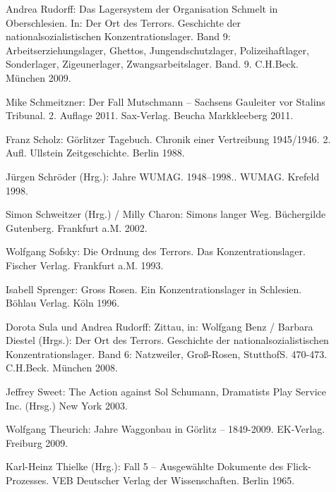 \begin{description}
\item[]{Andrea Rudorff: \glqq Das Lagersystem der Organisation Schmelt in Oberschlesien\grqq. In: \glqq Der Ort des Terrors. Geschichte der nationalsozialistischen Konzentrationslager. Band 9: Arbeitserziehungslager, Ghettos, Jungendschutzlager, Polizeihaftlager, Sonderlager, Zigeunerlager, Zwangsarbeitslager\grqq. Band. 9. C.H.Beck. München 2009. }

\item[]{Mike Schmeitzner: \glqq Der Fall Mutschmann -- Sachsens Gauleiter vor Stalins Tribunal\grqq. 2. Auflage 2011. Sax-Verlag. Beucha Markkleeberg 2011.}

\item[]{Franz Scholz: \glqq Görlitzer Tagebuch\grqq. Chronik einer Vertreibung 1945/1946. 2. Aufl. Ullstein Zeitgeschichte. Berlin 1988.}

\item[]{Jürgen Schröder (Hrg.):  Jahre WUMAG. 1948--1998.\grqq. WUMAG. Krefeld 1998. }

\item[]{Simon Schweitzer (Hrg.) / Milly Charon: \glqq Simons langer Weg\grqq. Büchergilde Gutenberg. Frankfurt a.M. 2002.}

\item[]{Wolfgang Sofsky: \glqq Die Ordnung des Terrors. Das Konzentrationslager\grqq. Fischer Verlag. Frankfurt a.M. 1993.}

\item[]{Isabell Sprenger: \glqq Gross Rosen. Ein Konzentrationslager in Schlesien\grqq. Böhlau Verlag. Köln 1996. }

\item[]{Dorota Sula und Andrea Rudorff: \glqq Zittau\grqq, in: Wolfgang Benz / Bar\-bara Die\-st\-el (Hrgs.): \glqq Der Ort des Terrors. Geschichte der nationalsozialistischen Konzentrationslager. Band 6: Natzweiler, Groß-Rosen, Stutthof\grqq S. 470-473. C.H.Beck. Mün\-chen 2008.}

\item[]{Jeffrey Sweet: \glqq The Action against Sol Schumann\grqq, Dramatists Play Service Inc. (Hrsg.) New York 2003.}

\item[]{Wolfgang Theurich:  Jahre Waggonbau in Görlitz -- 1849-2009\grqq. EK-Verlag. Freiburg 2009. }

\item[]{Karl-Heinz Thielke (Hrg.): \glqq Fall 5 -- Ausgewählte Dokumente des Flick-Prozesses\grqq. VEB Deutscher Verlag der Wissenschaften. Berlin 1965.}


\end{description}
